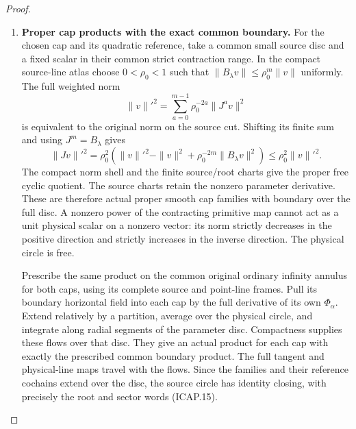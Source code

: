 \begin{proof}
\begin{enumerate}[label=\arabic*.]
\item \textbf{Proper cap products with the exact common boundary.}
For the chosen cap and its quadratic reference, take a common
small source disc and a fixed scalar in their common strict
contraction range. In the compact source-line atlas choose
\(0<\rho_0<1\) such that
\(\|B_\lambda v\|\leq\rho_0^m\|v\|\) uniformly.
The full weighted norm
\[
 \|v\|'^2=\sum_{a=0}^{m-1}\rho_0^{-2a}\|J^av\|^2
\]
is equivalent to the original norm on the source cut.
Shifting its finite sum and using \(J^m=B_\lambda\) gives
\[
 \|Jv\|'^2=\rho_0^2
 \left(\|v\|'^2-\|v\|^2+
        \rho_0^{-2m}\|B_\lambda v\|^2\right)
 \leq\rho_0^2\|v\|'^2.                                 \tag{ICAP.16}
\]
The compact norm shell and the finite source/root charts give
the proper free cyclic quotient. The source charts retain
the nonzero parameter derivative. These are therefore actual
proper smooth cap families with boundary over the full disc.
A nonzero power of the contracting primitive map cannot act
as a unit physical scalar on a nonzero vector: its norm
strictly decreases in the positive direction and strictly
increases in the inverse direction. The physical circle is free.

Prescribe the same product on the common original ordinary
infinity annulus for both caps, using its complete source and
point-line frames. Pull its boundary horizontal field into
each cap by the full derivative of its own \(\Phi_\alpha\).
Extend relatively by a partition, average over the physical
circle, and integrate along radial segments of the parameter
disc. Compactness supplies these flows over that disc.
They give an actual product for each cap with exactly the
prescribed common boundary product. The full tangent and
physical-line maps travel with the flows. Since the families
and their reference cochains extend over the disc, the source
circle has identity closing, with precisely the root and
sector words (ICAP.15).


\end{enumerate}
\end{proof}
